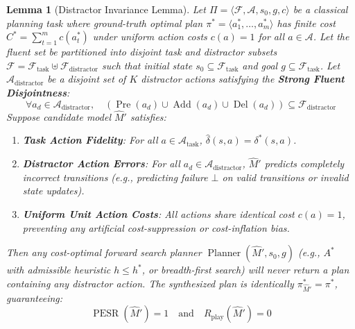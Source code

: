 \documentclass[11pt,a4paper]{article}
\newtheorem{lemma}[theorem]{Lemma}
\theoremstyle{definition}
\theoremstyle{remark}
\begin{document}
\begin{lemma}[Distractor Invariance Lemma]\label{lem:distractor_invariance}
Let $\Pi = \langle \mathcal{F}, \mathcal{A}, s_0, g, c \rangle$ be a classical planning task where ground-truth optimal plan $\pi^* = \langle a_1^*, \dots, a_m^* \rangle$ has finite cost $C^* = \sum_{t=1}^m c(a_t^*)$ under uniform action costs $c(a) = 1$ for all $a \in \mathcal{A}$.
Let the fluent set be partitioned into disjoint task and distractor subsets $\mathcal{F} = \mathcal{F}_{\text{task}} \uplus \mathcal{F}_{\text{distractor}}$ such that initial state $s_0 \subseteq \mathcal{F}_{\text{task}}$ and goal $g \subseteq \mathcal{F}_{\text{task}}$.
Let $\mathcal{A}_{\text{distractor}}$ be a disjoint set of $K$ distractor actions satisfying the \textbf{Strong Fluent Disjointness}:
\begin{equation}
    \forall a_d \in \mathcal{A}_{\text{distractor}}, \quad \left( \operatorname{Pre}(a_d) \cup \operatorname{Add}(a_d) \cup \operatorname{Del}(a_d) \right) \subseteq \mathcal{F}_{\text{distractor}}
\end{equation}
Suppose candidate model $\widehat{M}'$ satisfies:
\begin{enumerate}
    \item \textbf{Task Action Fidelity}: For all $a \in \mathcal{A}_{\text{task}}$, $\widehat{\delta}(s, a) = \delta^*(s, a)$.
    \item \textbf{Distractor Action Errors}: For all $a_d \in \mathcal{A}_{\text{distractor}}$, $\widehat{M}'$ predicts completely incorrect transitions (e.g., predicting failure $\bot$ on valid transitions or invalid state updates).
    \item \textbf{Uniform Unit Action Costs}: All actions share identical cost $c(a) = 1$, preventing any artificial cost-suppression or cost-inflation bias.
\end{enumerate}
Then any cost-optimal forward search planner $\operatorname{Planner}(\widehat{M}', s_0, g)$ (e.g., $A^*$ with admissible heuristic $h \le h^*$, or breadth-first search) will never return a plan containing any distractor action. The synthesized plan is identically $\pi^*_{\widehat{M}'} = \pi^*$, guaranteeing:
\begin{equation}
    \operatorname{PESR}(\widehat{M}') = 1 \quad \text{and} \quad R_{\text{play}}(\widehat{M}') = 0
\end{equation}
\end{lemma}
\end{document}
